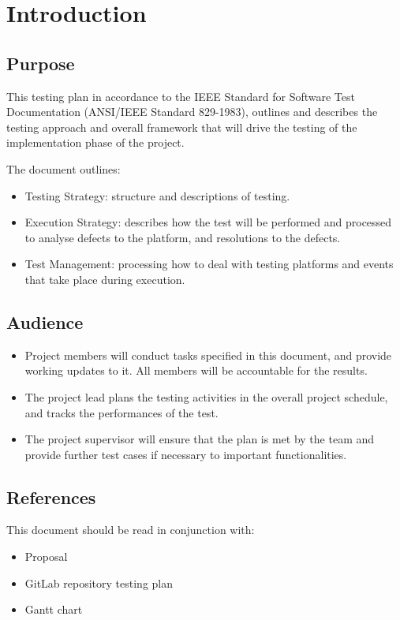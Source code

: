 \section{Introduction}
\subsection{Purpose}
This testing plan in accordance to the IEEE Standard for Software Test Documentation (ANSI/IEEE Standard 829-1983), outlines and describes the testing approach and overall framework that will drive the testing of the implementation phase of the project.

The document outlines:
\begin{itemize}
    \item Testing Strategy: structure and descriptions of testing.
    \item Execution Strategy: describes how the test will be performed and processed to analyse defects to the platform, and resolutions to the defects.
    \item Test Management: processing how to deal with testing platforms and events that take place during execution.
\end{itemize}

\subsection{Audience}
\begin{itemize}
    \item Project members will conduct tasks specified in this document, and provide working updates to it. All members will be accountable for the results.
    \item The project lead plans the testing activities in the overall project schedule, and tracks the performances of the test.
    \item The project supervisor will ensure that the plan is met by the team and provide further test cases if necessary to important functionalities.
\end{itemize}

\subsection{References}
This document should be read in conjunction with:
\begin{itemize}
    \item Proposal
    \item GitLab repository testing plan
    \item Gantt chart
\end{itemize}

